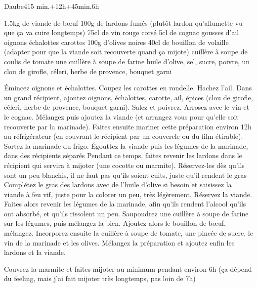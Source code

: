 \begin{recette}{Daube}{4}{15 min.+12h+45min.}{6h}
\begin{ingredients}
\ingredient 1.5kg de viande de bœuf
\ingredient 100g de lardons fumés (plutôt lardon qu'allumette vu que ça va cuire longtemps)
\ingredient 75cl de vin rouge corsé
\ingredient 5cl de cognac
 gousses d'ail
 oignons
 échalottes
 carottes
\ingredient 100g d'olives noires
\ingredient 40cl de bouillon de volaille (adapter pour que la viande soit recouverte quand ça mijote)
 cuillère à soupe de coulis de tomate
\ingredient une cuillère à soupe de farine
\ingredient huile d'olive, sel, sucre, poivre, un clou de girofle, céleri, herbe de provence, bouquet garni
\end{ingredients}

\begin{preparation}
\etape Émincez oignons et échalottes. Coupez les carottes en rondelle. Hachez l'ail. 
\etape Dans un grand récipient, ajoutez oignons, échalottes, carotte, ail, épices (clou de girofle, céleri, herbe de provence, bouquet garni). Salez et poivrez. Arrosez avec le vin et le cognac. Mélangez puis ajoutez la viande (et arrangez vous pour qu'elle soit recouverte par la marinade).
\etape Faites ensuite mariner cette préparation environ 12h au réfrigérateur (en couvrant le récipient par un couvercle ou du film étirable). 
\etape Sortez la marinade du frigo. Égouttez la viande puis les légumes de la marinade, dans des récipients séparés
\etape Pendant ce temps, faites revenir les lardons dans le récipient qui servira à mijoter (une cocotte ou marmite). Réservez-les dès qu'ils sont un peu blanchis, il ne faut pas qu'ils soient cuits, juste qu'il rendent le gras
\etape Complétez le gras des lardons avec de l'huile d'olive si besoin et saisissez la viande à feu vif, juste pour la colorer un peu, très légèrement. Réservez la viande. 
\etape Faites alors revenir les légumes de la marinade, afin qu'ils rendent l'alcool qu'ils ont absorbé, et qu'ils rissolent un peu. 
\etape Saupoudrez une cuillère à soupe de farine sur les légumes, puis mélangez la bien. Ajoutez alors le bouillon de bœuf, mélangez. 
\etape Incorporez ensuite la cuillère à soupe de tomate, une pincée de sucre, le vin de la marinade et les olives. 
\etape Mélangez la préparation et ajoutez enfin les lardons et la viande. 
\end{preparation}

\begin{cuisson}
Couvrez la marmite et faites mijoter au minimum pendant environ 6h (ça dépend du feeling, mais j'ai fait mijoter très longtemps, pas loin de 7h)
\end{cuisson}

\end{recette}

